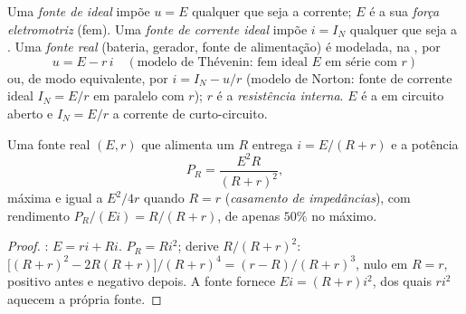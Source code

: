 \begin{definition}\label{def:b1:dc-circuits:sources}
Uma \emph{fonte de  ideal} impõe $u = E$ qualquer que seja a corrente;
$E$ é a sua \emph{força eletromotriz} (fem). Uma \emph{fonte de corrente
ideal} impõe $i = I_N$ qualquer que seja a . Uma \emph{fonte real}
(bateria, gerador, fonte de alimentação) é modelada, na , por
\[
u = E - r\,i \quad (\text{modelo de Thévenin: fem ideal } E \text{ em série com } r)
\]
ou, de modo equivalente, por $i = I_N - u/r$ (modelo de Norton: fonte de corrente
ideal $I_N = E/r$ em paralelo com $r$); $r$ é a \emph{resistência
interna}. $E$ é a  em circuito aberto e $I_N = E/r$ a
corrente de curto-circuito.
\end{definition}

\begin{proposition}\label{prop:b1:dc-circuits:sourcepower}
Uma fonte real $(E, r)$ que alimenta um  $R$ entrega $i = E/(R + r)$
e a potência
\[
P_R = \frac{E^2 R}{(R + r)^2},
\]
máxima e igual a $E^2/4r$ quando $R = r$ (\emph{casamento de impedâncias}),
com rendimento $P_R/(Ei) = R/(R + r)$, de apenas $50\%$ no máximo.
\end{proposition}

\begin{proof}
: $E = ri + Ri$. $P_R = Ri^2$; derive $R/(R + r)^2$:
$\big[(R + r)^2 - 2R(R + r)\big]/(R + r)^4 = (r - R)/(R + r)^3$, nulo em
$R = r$, positivo antes e negativo depois. A fonte fornece
$Ei = (R + r)i^2$, dos quais $ri^2$ aquecem a própria fonte.
\end{proof}

